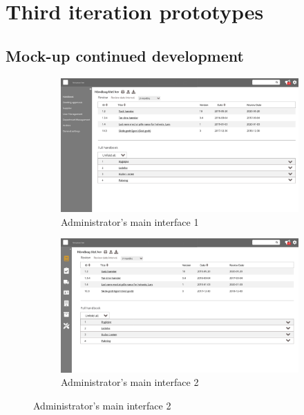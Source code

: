 \chapter{Third iteration prototypes} \label{chap:3-Prototypes}
\section{Mock-up continued development}\label{sec:2Mock}
\begin{figure}[H]
	\centering
	\begin{subfigure}[b]{0.48\textwidth}
		\includegraphics[width=\textwidth]{billeder/iteration3Prototyper/Page_11.jpg}
		\caption{Administrator's main interface 1}
		\label{fig:5-Main1}
	\end{subfigure}
	\quad
	\begin{subfigure}[b]{0.48\textwidth}
		\includegraphics[width=\textwidth]{billeder/iteration3Prototyper/Page_13.jpg}
		\caption{Administrator's main interface 2}
		\label{fig:5-Main2}
	\end{subfigure}
\end{figure}
